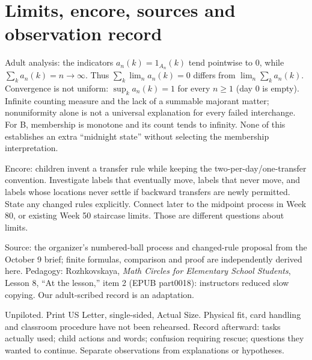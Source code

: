 \documentclass[11pt,letterpaper]{article}
\begin{document}
\section*{Limits, encore, sources and observation record}
Adult analysis: the indicators $a_n(k)=1_{A_n}(k)$ tend pointwise to 0, while $\sum_k a_n(k)=n\to\infty$. Thus $\sum_k\lim_n a_n(k)=0$ differs from $\lim_n\sum_k a_n(k)$. Convergence is not uniform: $\sup_k a_n(k)=1$ for every $n\ge1$ (day 0 is empty). Infinite counting measure and the lack of a summable majorant matter; nonuniformity alone is not a universal explanation for every failed interchange. For B, membership is monotone and its count tends to infinity. None of this establishes an extra ``midnight state'' without selecting the membership interpretation.

Encore: children invent a transfer rule while keeping the two-per-day/one-transfer convention. Investigate labels that eventually move, labels that never move, and labels whose locations never settle if backward transfers are newly permitted. State any changed rules explicitly. Connect later to the midpoint process in Week 80, or existing Week 50 staircase limits. Those are different questions about limits.

Source: the organizer's numbered-ball process and changed-rule proposal from the October 9 brief; finite formulas, comparison and proof are independently derived here. Pedagogy: Rozhkovskaya, \emph{Math Circles for Elementary School Students}, Lesson 8, ``At the lesson,'' item 2 (EPUB part0018): instructors reduced slow copying. Our adult-scribed record is an adaptation.

Unpiloted. Print US Letter, single-sided, Actual Size. Physical fit, card handling and classroom procedure have not been rehearsed. Record afterward: tasks actually used; child actions and words; confusion requiring rescue; questions they wanted to continue. Separate observations from explanations or hypotheses.
\end{document}
